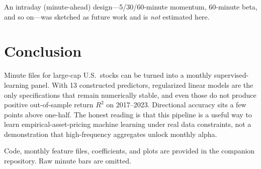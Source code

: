 \documentclass[11pt,twocolumn]{article}
\begin{document}
An intraday (minute-ahead) design---5/30/60-minute momentum, 60-minute beta, and so on---was sketched as future work and is \emph{not} estimated here.

\section{Conclusion}

Minute files for large-cap U.S.\ stocks can be turned into a monthly supervised-learning panel. With 13 constructed predictors, regularized linear models are the only specifications that remain numerically stable, and even those do not produce positive out-of-sample return $R^2$ on 2017--2023. Directional accuracy sits a few points above one-half. The honest reading is that this pipeline is a useful way to learn empirical-asset-pricing machine learning under real data constraints, not a demonstration that high-frequency aggregates unlock monthly alpha.

Code, monthly feature files, coefficients, and plots are provided in the companion repository. Raw minute bars are omitted.



\end{document}

